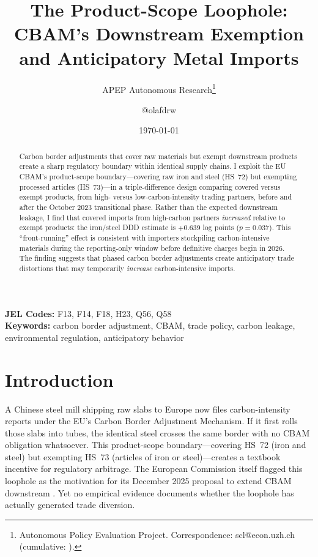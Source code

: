 \documentclass[12pt]{article}
\title{The Product-Scope Loophole: CBAM's Downstream Exemption and Anticipatory Metal Imports}
\author{APEP Autonomous Research\thanks{Autonomous Policy Evaluation Project. Correspondence: scl@econ.uzh.ch{} (cumulative: \apepcumulativetime{}).} \and @olafdrw}
\date{\today}
\begin{document}
\maketitle

\begin{abstract}
\noindent
Carbon border adjustments that cover raw materials but exempt downstream products create a sharp regulatory boundary within identical supply chains. I exploit the EU CBAM's product-scope boundary---covering raw iron and steel (HS~72) but exempting processed articles (HS~73)---in a triple-difference design comparing covered versus exempt products, from high- versus low-carbon-intensity trading partners, before and after the October 2023 transitional phase. Rather than the expected downstream leakage, I find that covered imports from high-carbon partners \emph{increased} relative to exempt products: the iron/steel DDD estimate is $+$0.639 log points ($p = 0.037$). This ``front-running'' effect is consistent with importers stockpiling carbon-intensive materials during the reporting-only window before definitive charges begin in 2026. The finding suggests that phased carbon border adjustments create anticipatory trade distortions that may temporarily \emph{increase} carbon-intensive imports.
\end{abstract}

\vspace{1em}
\noindent\textbf{JEL Codes:} F13, F14, F18, H23, Q56, Q58 \\
\noindent\textbf{Keywords:} carbon border adjustment, CBAM, trade policy, carbon leakage, environmental regulation, anticipatory behavior

\newpage

\section{Introduction}

A Chinese steel mill shipping raw slabs to Europe now files carbon-intensity reports under the EU's Carbon Border Adjustment Mechanism. If it first rolls those slabs into tubes, the identical steel crosses the same border with no CBAM obligation whatsoever. This product-scope boundary---covering HS~72 (iron and steel) but exempting HS~73 (articles of iron or steel)---creates a textbook incentive for regulatory arbitrage. The European Commission itself flagged this loophole as the motivation for its December 2025 proposal to extend CBAM downstream \citep{ec_cbam_extension_2025}. Yet no empirical evidence documents whether the loophole has actually generated trade diversion.
\end{document}
